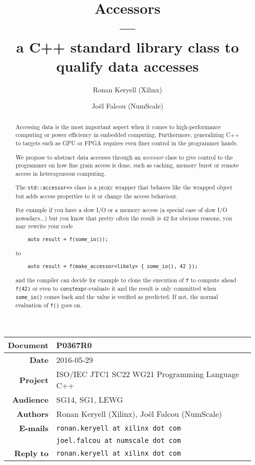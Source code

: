 \documentclass[a4paper]{article}
\title{Accessors\\
  ---\\
  a C++ standard library class to qualify data accesses}
\author{Ronan Keryell (Xilinx)
  \and Joël Falcou (NumScale)}
\begin{document}
\maketitle

\begin{tabular}{|r|l|}
  \hline
  \textbf{Document} & P0367R0\\\hline
  \textbf{Date} & 2016-05-29\\\hline
  \textbf{Project} & ISO/IEC JTC1 SC22 WG21 Programming Language C++\\\hline
  \textbf{Audience} & SG14, SG1, LEWG\\\hline
  \textbf{Authors} &  Ronan Keryell (Xilinx), Joël Falcou (NumScale)\\\hline
  \textbf{E-mails} & \texttt{ronan.keryell at xilinx dot com}\\
                   & \texttt{joel.falcou at numscale dot com}\\\hline
  \textbf{Reply to} & \texttt{ronan.keryell at xilinx dot com}\\\hline
\end{tabular}


\begin{abstract}
  Accessing data is the most important aspect when it comes to
  high-performance computing or power efficiency in embedded
  computing. Furthermore, generalizing C++ to targets such as GPU or
  FPGA requires even finer control in the programmer hands.

  We propose to abstract data accesses through an \emph{accessor}
  class to give control to the programmer on how fine grain access is
  done, such as caching, memory burst or remote access in
  heterogeneous computing.

  The \lstinline|std::accessor<>| class is a proxy wrapper that
  behaves like the wrapped object but adds access properties to it or
  change the access behaviour.

  For example if you have a slow I/O or a memory access (a special
  case of slow I/O nowadays...) but you know that pretty often the
  result is 42 for obvious reasons, you may rewrite your code
  \begin{lstlisting}
    auto result = f(some_io());
  \end{lstlisting}
  to
  \begin{lstlisting}
    auto result = f(make_accessor<likely> { some_io(), 42 });
  \end{lstlisting}
  and the compiler can decide for example to clone the execution of
  \lstinline|f| to compute ahead \lstinline|f(42)| or even to
  \lstinline|constexpr|-evaluate it and the result is only committed
  when \lstinline|some_io()| comes back and the value is verified as
  predicted. If not, the normal evaluation of \lstinline|f()| goes on.
\end{abstract}
\end{document}
